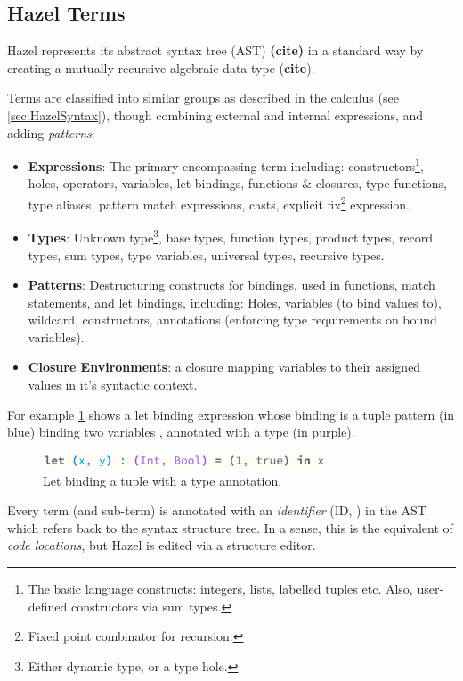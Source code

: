 \subsection{Hazel Terms}
\label{sec:HazelTerms}
Hazel represents its abstract syntax tree (AST) \textbf{(cite)} in a standard way by creating a mutually recursive algebraic data-type (\textbf{cite}). 

Terms are classified into similar groups as described in the calculus (see \cref{sec:HazelSyntax}), though combining external and internal expressions, and adding \textit{patterns}:
\begin{itemize}
\item \textbf{Expressions}: The primary encompassing term including: constructors\footnote{The basic language constructs: integers, lists, labelled tuples etc. Also, user-defined constructors via sum types.}, holes, operators, variables, let bindings, functions \& closures, type functions, type aliases, pattern match expressions, casts, explicit fix\footnote{Fixed point combinator for recursion.} expression.
\item \textbf{Types}: Unknown type\footnote{Either dynamic type, or a type hole.}, base types, function types, product types, record types, sum types, type variables, universal types, recursive types.
\item \textbf{Patterns}: Destructuring constructs for bindings, used in functions, match statements, and let bindings, including: Holes, variables (to bind values to), wildcard, constructors, annotations (enforcing type requirements on bound variables). 
\item \textbf{Closure Environments}: a closure mapping variables to their assigned values in it's syntactic context.
\end{itemize}

For example \cref{fig:tupletermstructure} shows a let binding expression whose binding is a tuple pattern (in blue) binding two variables ,  annotated with a type (in purple).

\begin{figure}[h]
\center\includegraphics[width=0.75\textwidth]{Media/Figures/tuple_term_structure}
\caption{Let binding a tuple with a type annotation.}
\label{fig:tupletermstructure}
\end{figure}

Every term (and sub-term) is annotated with an \textit{identifier} (ID, ) in the AST which refers back to the syntax structure tree. In a sense, this is the equivalent of \textit{code locations}, but Hazel is edited via a structure editor. 
